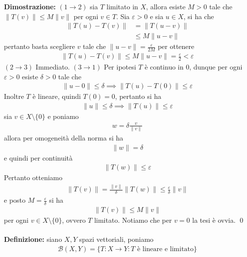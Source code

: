 \documentclass{article}
\numberwithin{equation}{subsection}
\begin{document}
\textbf{Dimostrazione:} $(1 \rightarrow 2)$ sia $T$ limitato in $X$, allora esiste $M > 0$ tale che $\|T(v)\| \leq M\|v\|$ per ogni $v \in T$. Sia $\varepsilon > 0$ e sia $u \in X$, si ha che
\begin{align*}
    \|T(u) - T(v)\| &= \|T(u - v)\|  \\
    &\leq M\|u - v\| 
\end{align*}
pertanto basta scegliere $v$ tale che $\|u - v\| = \frac{\varepsilon}{2M}$ per ottenere
\begin{align*}
    \|T(u) - T(v)\| \leq M\|u - v\| = \frac{\varepsilon}{2} < \varepsilon 
\end{align*}
$(2 \rightarrow 3)$ Immediato. $(3 \rightarrow 1)$ Per ipotesi $T$ è continuo in $0$, dunque per ogni $\varepsilon > 0$ esiste $\delta > 0$ tale che
\begin{align*}
    \|u - 0\| \leq \delta \implies \|T(u) - T(0)\| \leq \varepsilon 
\end{align*}
Inoltre $T$ è lineare, quindi $T(0) = 0$, pertanto si ha
\begin{align*}
    \|u\| \leq \delta \implies \|T(u)\| \leq \varepsilon 
\end{align*}
sia $v \in X \setminus \{0\}$ e poniamo
\begin{align*}
    w = \delta\frac{v}{\|v\|} 
\end{align*}
allora per omogeneità della norma si ha
\begin{align*}
    \|w\| = \delta 
\end{align*}
e quindi per continuità
\begin{align*}
    \|T(w)\| \leq \varepsilon 
\end{align*}
Pertanto otteniamo
\begin{align*}
    \|T(v)\| = \frac{\|v\|}{\delta}\|T(w)\| \leq \frac{\varepsilon}{\delta}\|v\| 
\end{align*}
e posto $M = \frac{\varepsilon}{\delta}$ si ha
\begin{align*}
    \|T(v)\| \leq M\|v\| 
\end{align*}
per ogni $v \in X \setminus \{0\}$, ovvero $T$ limitato. Notiamo che per $v = 0$ la tesi è ovvia. \qed \\ \\
\textbf{Definizione:} siano $X, Y$ spazi vettoriali, poniamo
\begin{align*}
    \mathcal{B}(X, Y) = \{T : X \longrightarrow Y : T \text{ è lineare e limitato}\} 
\end{align*} \\
\end{document}
